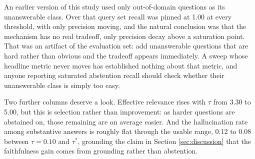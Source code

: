 \documentclass[conference]{IEEEtran}
\begin{document}
An earlier version of this study used only out-of-domain questions as its unanswerable class. Over that query set recall was pinned at 1.00 at every threshold, with only precision moving, and the natural conclusion was that the mechanism has no real tradeoff, only precision decay above a saturation point. That was an artifact of the evaluation set: add unanswerable questions that are hard rather than obvious and the tradeoff appears immediately. A sweep whose headline metric never moves has established nothing about that metric, and anyone reporting saturated abstention recall should check whether their unanswerable class is simply too easy.

Two further columns deserve a look. Effective relevance rises with $\tau$ from 3.30 to 5.00, but this is selection rather than improvement: as harder questions are abstained on, those remaining are on average easier. And the hallucination rate among substantive answers is roughly flat through the usable range, 0.12 to 0.08 between $\tau = 0.10$ and $\tau^\ast$, grounding the claim in Section \ref{sec:discussion} that the faithfulness gain comes from grounding rather than abstention.
\end{document}
